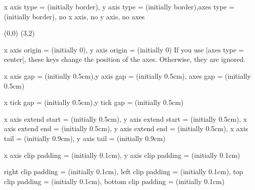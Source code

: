 \begin{sseqdata}[name = basic, cohomological Serre grading]
\begin{keylist}{x axis type =  (initially border), y axis type =  (initially border),axes type =  (initially border), no x axis, no y axis, no axes}
\begin{codeexample}[width=6cm]
\begin{sseqpage}[ axes type = frame ]
\class(0,0)
\class(3,2)
\end{sseqpage}
\end{codeexample}
\end{keylist}

\parskip=0pt
\begin{keylist}{x axis origin =  (initially 0), y axis origin =  (initially 0)}
If you use |axes type = center|, these keys change the position of the axes. Otherwise, they are ignored.
\end{keylist}
%
\begin{keylist}{x axis gap =  (initially 0.5cm),y axis gap =  (initially 0.5cm), axes gap =  (initially 0.5cm)}
%
\end{keylist}
%
\begin{keylist}{x tick gap =  (initially 0.5cm),y tick gap =  (initially 0.5cm)}
%
\end{keylist}
%
\begin{keylist}{
    x axis extend start =  (initially 0.5cm), y axis extend start =  (initially 0.5cm),
    x axis extend end =  (initially 0.5cm), y axis extend end =  (initially 0.5cm),
    x axis tail =  (initially 0.9cm), y axis tail =  (initially 0.9cm)%
}
\end{keylist}
%
\begin{keylist}{x axis clip padding =  (initially 0.1cm), y axis clip padding =  (initially 0.1cm)}
\end{keylist}
%
\begin{keylist}{
    right clip padding =  (initially 0.1cm), left clip padding =  (initially 0.1cm),
     top clip padding =  (initially 0.1cm), bottom clip padding =  (initially 0.1cm)%
}
\end{keylist}

\afterpage{
\begin{center}

\end{center}
}



\end{sseqdata}
